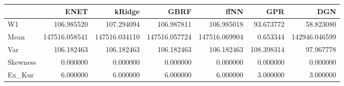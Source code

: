 \begin{tabular}{lrrrrrr}
\toprule
{} &           ENET &         kRidge &           GBRF &           ffNN &         GPR &            DGN \\
\midrule
W1       &     106.985520 &     107.294094 &     106.987811 &     106.985018 &   93.673772 &      58.823080 \\
Mean     &  147516.058541 &  147516.034110 &  147516.057724 &  147516.069904 &    0.653344 &  142946.046599 \\
Var      &     106.182463 &     106.182463 &     106.182463 &     106.182463 &  108.398314 &      97.967778 \\
Skewness &       0.000000 &       0.000000 &       0.000000 &       0.000000 &    0.000000 &       0.000000 \\
Ex\_Kur   &       6.000000 &       6.000000 &       6.000000 &       6.000000 &    3.000000 &       3.000000 \\
\bottomrule
\end{tabular}
